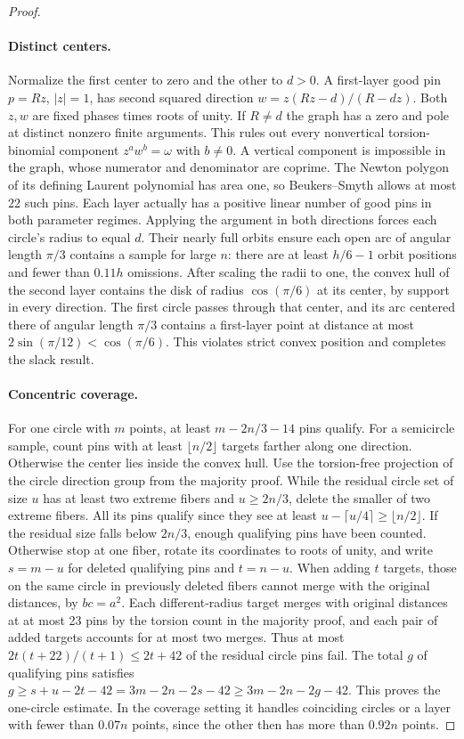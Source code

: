 \begin{proof}
\paragraph{Distinct centers.}
Normalize the first center to zero and the other to \(d>0\). A first-layer
good pin \(p=Rz\), \(|z|=1\), has second squared direction
\(w=z(Rz-d)/(R-dz)\). Both \(z,w\) are fixed phases times roots of unity.
If \(R\ne d\) the graph has a zero and pole at distinct nonzero finite
arguments. This rules out every nonvertical torsion-binomial component
\(z^aw^b=\omega\) with \(b\ne0\). A vertical component is impossible in
the graph, whose numerator and denominator are coprime. The Newton polygon
of its defining Laurent polynomial has area one, so Beukers--Smyth allows
at most 22 such pins. Each layer actually has a positive linear number
of good pins in both parameter regimes. Applying the argument in both
directions forces each circle's radius to equal \(d\). Their nearly full
orbits ensure each open arc of angular length \(\pi/3\) contains a sample
for large \(n\): there are at least \(h/6-1\) orbit positions and fewer
than \(0.11h\) omissions. After scaling the radii to one, the convex hull
of the second layer contains the disk of radius \(\cos(\pi/6)\) at its
center, by support in every direction. The first circle passes through
that center, and its arc centered there of angular length \(\pi/3\)
contains a first-layer point at distance at most \(2\sin(\pi/12)<\cos(\pi/6)\).
This violates strict convex position and completes the slack result.

\paragraph{Concentric coverage.}
For one circle with \(m\) points, at least \(m-2n/3-14\) pins qualify.
For a semicircle sample, count pins with at least \(\lfloor n/2\rfloor\)
targets farther along one direction. Otherwise the center lies inside
the convex hull. Use the torsion-free projection of the circle direction
group from the majority proof. While the residual circle set of size \(u\)
has at least two extreme fibers and \(u\ge2n/3\), delete the smaller of two
extreme fibers. All its pins qualify since they see at least
\(u-\lceil u/4\rceil\ge\lfloor n/2\rfloor\). If the residual size falls below
\(2n/3\), enough qualifying pins have been counted. Otherwise stop at one
fiber, rotate its coordinates to roots of unity, and write \(s=m-u\) for
deleted qualifying pins and \(t=n-u\). When adding \(t\) targets, those
on the same circle in previously deleted fibers cannot merge with the
original distances, by \(bc=a^2\). Each different-radius target merges with
original distances at at most 23 pins by the torsion count in the majority
proof, and each pair of added targets accounts for at most two merges.
Thus at most \(2t(t+22)/(t+1)\le2t+42\) of the residual circle pins fail.
The total \(g\) of qualifying pins satisfies
\(g\ge s+u-2t-42=3m-2n-2s-42\ge3m-2n-2g-42\).
This proves the one-circle estimate. In the coverage setting it handles
coinciding circles or a layer with fewer than \(0.07n\) points, since the
other then has more than \(0.92n\) points.


\end{proof}
